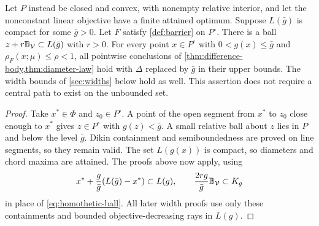 \begin{proposition}
\label{prop:localization}
Let $P$ instead be closed and convex, with nonempty relative interior,
and let the nonconstant linear objective have a finite attained optimum.
Suppose $L(\bar g)$ is compact for some $\bar g>0$. Let $F$ satisfy
\cref{def:barrier} on $P^\circ$. There is a ball
$z+r\mathbb B_{\mathcal V}\subset L(\bar g)$ with $r>0$. For every point $x\in P^\circ$
with $0<g(x)\leq\bar g$ and $\rho_F(x;\mu)\leq\rho<1$, all pointwise
conclusions of \cref{thm:difference-body,thm:diameter-law} hold with
$\Delta$ replaced by $\bar g$ in their upper bounds. The width bounds
of \cref{sec:widths} below hold as well. This assertion does not
require a central path to exist on the unbounded set.
\end{proposition}

\begin{proof}
Take $x^*\in\Phi$ and $z_0\in P^\circ$. A point of the open segment
from $x^*$ to $z_0$ close enough to $x^*$ gives $z\in P^\circ$ with
$g(z)<\bar g$. A small relative ball about $z$ lies in $P$ and below
the level $\bar g$. Dikin containment and semiboundedness are proved on line
segments, so they remain valid. The set $L(g(x))$ is
compact, so diameters and chord maxima are attained. The proofs above
now apply, using
\[
 x^*+\frac{g}{\bar g}(L(\bar g)-x^*)\subset L(g),\qquad
 \frac{2rg}{\bar g}\mathbb B_{\mathcal V}\subset K_g
\]
in place of \eqref{eq:homothetic-ball}. All later width proofs use only
these containments and bounded objective-decreasing rays in $L(g)$.
\end{proof}
